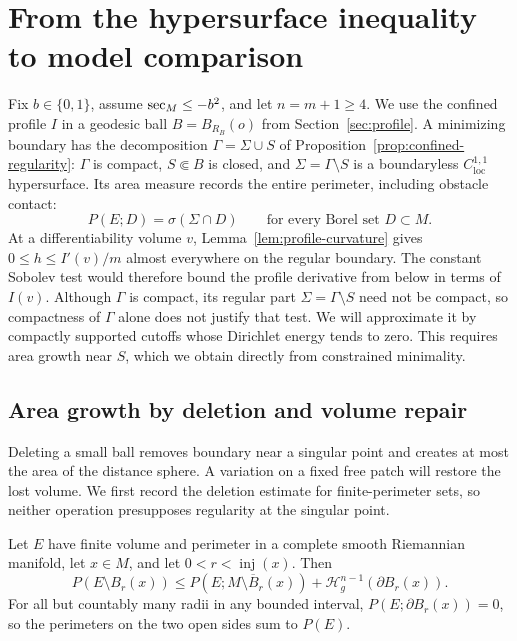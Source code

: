 \section{From the hypersurface inequality to model comparison}
\label{sec:comparison}

Fix $b\in\{0,1\}$, assume $\operatorname{sec}_M\le-b^2$, and let $n=m+1\ge4$.
We use the confined profile $I$ in a geodesic ball $B=B_{R_B}(o)$
from Section~\ref{sec:profile}.  A minimizing boundary has the
decomposition $\Gamma=\Sigma\cup S$ of
Proposition~\ref{prop:confined-regularity}: $\Gamma$ is compact,
$S\Subset B$ is closed, and $\Sigma=\Gamma\setminus S$ is a
boundaryless $C^{1,1}_{\mathrm{loc}}$ hypersurface.  Its area measure
records the entire perimeter, including obstacle contact:
\begin{equation}
\label{eq:regular-perimeter-measure}
 P(E;D)=\sigma(\Sigma\cap D)
 \qquad\text{for every Borel set }D\subset M.
\end{equation}
At a differentiability volume $v$, Lemma~\ref{lem:profile-curvature} gives
$0\le h\le I'(v)/m$ almost everywhere on the regular boundary. The constant Sobolev test
would therefore bound the profile derivative from below in terms of
$I(v)$. Although $\Gamma$ is compact, its regular part
$\Sigma=\Gamma\setminus S$ need not be compact, so compactness of
$\Gamma$ alone does not justify that test. We will approximate it by compactly
supported cutoffs whose Dirichlet energy tends to zero. This requires
area growth near $S$, which we obtain directly from constrained minimality.

\subsection{Area growth by deletion and volume repair}

Deleting a small ball removes boundary near a singular point and creates
at most the area of the distance sphere. A variation on a fixed free
patch will restore the lost volume. We first record the deletion estimate
for finite-perimeter sets, so neither operation presupposes regularity
at the singular point.

\begin{lemma}\label{lem:bv-deletion}
Let $E$ have finite volume and perimeter in a complete smooth
Riemannian manifold, let $x\in M$, and let
$0<r<\operatorname{inj}(x)$. Then
\begin{equation}\label{eq:bv-deletion}
 P(E\setminus B_r(x))\le
 P(E;M\setminus\overline B_r(x))
       +\mathcal H_g^{n-1}(\partial B_r(x)).
\end{equation}
For all but countably many radii in any bounded interval,
$P(E;\partial B_r(x))=0$, so the perimeters on the two open sides
sum to $P(E)$.
\end{lemma}

